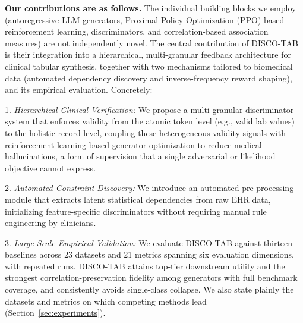 \noindent\textbf{Our contributions are as follows.} The individual building blocks we employ (autoregressive LLM generators, Proximal Policy Optimization (PPO)-based reinforcement learning, discriminators, and correlation-based association measures) are not independently novel. The central contribution of DISCO-TAB is their integration into a hierarchical, multi-granular feedback architecture for clinical tabular synthesis, together with two mechanisms tailored to biomedical data (automated dependency discovery and inverse-frequency reward shaping), and its empirical evaluation. Concretely:

1. \textit{Hierarchical Clinical Verification:} We propose a multi-granular discriminator system that enforces validity from the atomic token level (e.g., valid lab values) to the holistic record level, coupling these heterogeneous validity signals with reinforcement-learning-based generator optimization to reduce medical hallucinations, a form of supervision that a single adversarial or likelihood objective cannot express.

2. \textit{Automated Constraint Discovery:} We introduce an automated pre-processing module that extracts latent statistical dependencies from raw EHR data, initializing feature-specific discriminators without requiring manual rule engineering by clinicians. 

3. \textit{Large-Scale Empirical Validation:} We evaluate DISCO-TAB against thirteen baselines across 23 datasets and 21 metrics spanning six evaluation dimensions, with repeated runs. DISCO-TAB attains top-tier downstream utility and the strongest correlation-preservation fidelity among generators with full benchmark coverage, and consistently avoids single-class collapse. We also state plainly the datasets and metrics on which competing methods lead (Section~\ref{sec:experiments}).
